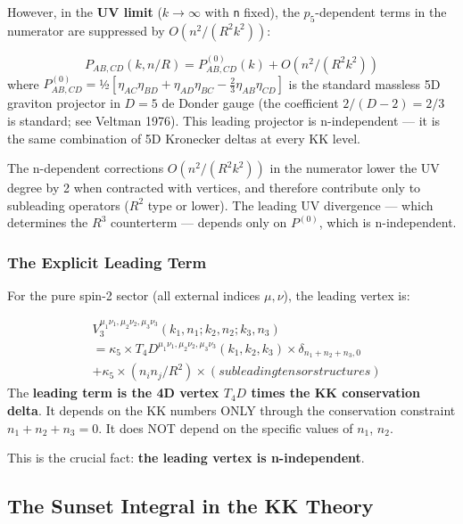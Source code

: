 \documentclass[aps,prd,preprint,superscriptaddress,longbibliography,floatfix]{revtex4-2}
\theoremstyle{remark}
\begin{document}
However, in the \textbf{UV limit} ($k \to \infty$ with \texttt{n} fixed), the $p_{5}$-dependent terms in the numerator are suppressed by $O(n^{2}/(R^{2}k^{2}))$:


\begin{equation}
    P_{AB,CD}(k, n/R) = P_{AB,CD}^{(0)}(k) + O(n^{2}/(R^{2}k^{2}))
\end{equation}
where $P^{(0)}_{AB,CD} = $½$[\eta_{AC}\eta_{BD} + \eta_{AD}\eta_{BC} - \tfrac{2}{3}\eta_{AB}\eta_{CD}]$ is the standard massless 5D graviton projector in $D = 5$ de Donder gauge (the coefficient $2/(D-2) = 2/3$ is standard; see Veltman 1976). This leading projector is n-independent --- it is the same combination of 5D Kronecker deltas at every KK level.

The n-dependent corrections $O(n^{2}/(R^{2}k^{2}))$ in the numerator lower the UV degree by 2 when contracted with vertices, and therefore contribute only to subleading operators ($R^{2}$ type or lower). The leading UV divergence --- which determines the $R^{3}$ counterterm --- depends only on $P^{(0)}$, which is n-independent.


\subsubsection{The Explicit Leading Term}

For the pure spin-2 sector (all external indices $\mu, \nu$), the leading vertex is:


\begin{align}
    & V_{3}^{\mu_{1}\nu_{1}, \mu_{2}\nu_{2}, \mu_{3}\nu_{3}}(k_{1},n_{1}; k_{2},n_{2}; k_{3},n_{3}) \\
    & = \kappa_{5} \times T_{4}D^{\mu_{1}\nu_{1}, \mu_{2}\nu_{2}, \mu_{3}\nu_{3}}(k_{1}, k_{2}, k_{3}) \times \delta_{n_{1}+n_{2}+n_{3}, 0} \\
    & + \kappa_{5} \times (n_i n_j / R^{2}) \times (subleading tensor structures)
\end{align}
The \textbf{leading term is the 4D vertex $T_{4}D$ times the KK conservation delta}. It depends on the KK numbers ONLY through the conservation constraint $n_{1} + n_{2} + n_{3} = 0$. It does NOT depend on the specific values of $n_{1}$, $n_{2}$.

This is the crucial fact: \textbf{the leading vertex is n-independent}.



\subsection{The Sunset Integral in the KK Theory}
\end{document}
